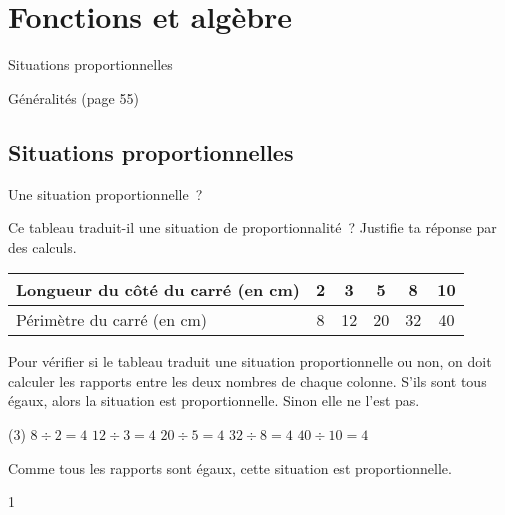 \documentclass[a4paper,11pt]{report}
\begin{document}
\newcommand{\chapterName}{Fonctions et algèbre}
\newcommand{\serieName}{Situations proportionnelles}


\chapter*{\chapterName}
\thispagestyle{empty}

\begin{amL}{\serieName}{
\item Généralités (page 55)}
\end{amL}
\section*{\serieName}
\setcounter{page}{1}
\thispagestyle{firstPage}




\begin{resolu}{Une situation proportionnelle~?}{
Ce tableau traduit-il une situation de proportionnalité~? Justifie ta réponse par des calculs.

\begin{center}
\begin{tabular}{|l|c|c|c|c|c|}\hline
Longueur du côté du carré (en cm) & 2 & 3 & 5 & 8 & 10 \\\hline
Périmètre du carré (en cm) & 8 & 12 & 20 & 32 & 40\\\hline
\end{tabular}
\end{center}
Pour vérifier si le tableau traduit une situation proportionnelle ou non, on doit calculer les rapports entre les deux nombres de chaque colonne. S'ils sont tous égaux, alors la situation est proportionnelle. Sinon elle ne l'est pas.
\begin{tasks}(3)
\task[] $8 \div 2 = 4$
\task[] $12 \div 3 =4$
\task[] $20 \div 5 = 4$
\task[] $32 \div 8 = 4$
\task[] $40 \div 10 = 4$
\end{tasks}
Comme tous les rapports sont égaux, cette situation est proportionnelle.
}{1}
\end{resolu}
\end{document}
